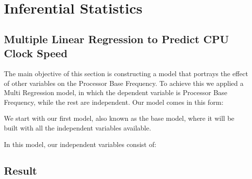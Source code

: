 \section{Inferential Statistics}

\subsection{Multiple Linear Regression to Predict CPU Clock Speed}
The main objective of this section is constructing a model that portrays the effect of other variables on the Processor Base Frequency. To achieve this we applied a Multi Regression model, in which the dependent variable is Processor Base Frequency, while the rest are independent. Our model comes in this form:


We start with our first model, also known as the base model, where it will be built with all the independent variables available.


In this model, our independent variables consist of: 



\subsection{Result}

\newpage
